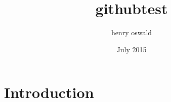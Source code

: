 \documentclass{article}
\title{githubtest}
\author{henry oswald}
\date{July 2015}
\begin{document}
\maketitle

\section{Introduction}
\end{document}
